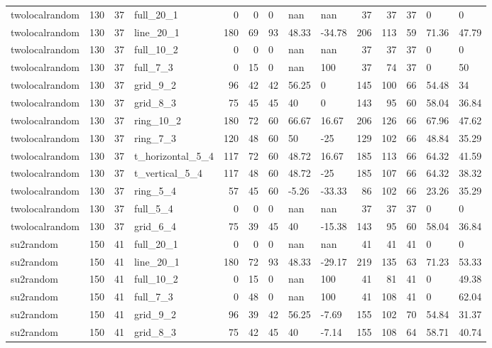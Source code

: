 \begin{longtable}{lrrlrrlllrrlll}
twolocalrandom & 130 & 37 & full\_20\_1 & 0 & 0 & 0 & nan & nan & 37 & 37 & 37 & 0 & 0 \\
twolocalrandom & 130 & 37 & line\_20\_1 & 180 & 69 & 93 & 48.33 & -34.78 & 206 & 113 & 59 & 71.36 & 47.79 \\
twolocalrandom & 130 & 37 & full\_10\_2 & 0 & 0 & 0 & nan & nan & 37 & 37 & 37 & 0 & 0 \\
twolocalrandom & 130 & 37 & full\_7\_3 & 0 & 15 & 0 & nan & 100 & 37 & 74 & 37 & 0 & 50 \\
twolocalrandom & 130 & 37 & grid\_9\_2 & 96 & 42 & 42 & 56.25 & 0 & 145 & 100 & 66 & 54.48 & 34 \\
twolocalrandom & 130 & 37 & grid\_8\_3 & 75 & 45 & 45 & 40 & 0 & 143 & 95 & 60 & 58.04 & 36.84 \\
twolocalrandom & 130 & 37 & ring\_10\_2 & 180 & 72 & 60 & 66.67 & 16.67 & 206 & 126 & 66 & 67.96 & 47.62 \\
twolocalrandom & 130 & 37 & ring\_7\_3 & 120 & 48 & 60 & 50 & -25 & 129 & 102 & 66 & 48.84 & 35.29 \\
twolocalrandom & 130 & 37 & t\_horizontal\_5\_4 & 117 & 72 & 60 & 48.72 & 16.67 & 185 & 113 & 66 & 64.32 & 41.59 \\
twolocalrandom & 130 & 37 & t\_vertical\_5\_4 & 117 & 48 & 60 & 48.72 & -25 & 185 & 107 & 66 & 64.32 & 38.32 \\
twolocalrandom & 130 & 37 & ring\_5\_4 & 57 & 45 & 60 & -5.26 & -33.33 & 86 & 102 & 66 & 23.26 & 35.29 \\
twolocalrandom & 130 & 37 & full\_5\_4 & 0 & 0 & 0 & nan & nan & 37 & 37 & 37 & 0 & 0 \\
twolocalrandom & 130 & 37 & grid\_6\_4 & 75 & 39 & 45 & 40 & -15.38 & 143 & 95 & 60 & 58.04 & 36.84 \\
su2random & 150 & 41 & full\_20\_1 & 0 & 0 & 0 & nan & nan & 41 & 41 & 41 & 0 & 0 \\
su2random & 150 & 41 & line\_20\_1 & 180 & 72 & 93 & 48.33 & -29.17 & 219 & 135 & 63 & 71.23 & 53.33 \\
su2random & 150 & 41 & full\_10\_2 & 0 & 15 & 0 & nan & 100 & 41 & 81 & 41 & 0 & 49.38 \\
su2random & 150 & 41 & full\_7\_3 & 0 & 48 & 0 & nan & 100 & 41 & 108 & 41 & 0 & 62.04 \\
su2random & 150 & 41 & grid\_9\_2 & 96 & 39 & 42 & 56.25 & -7.69 & 155 & 102 & 70 & 54.84 & 31.37 \\
su2random & 150 & 41 & grid\_8\_3 & 75 & 42 & 45 & 40 & -7.14 & 155 & 108 & 64 & 58.71 & 40.74 \\

\end{longtable}

